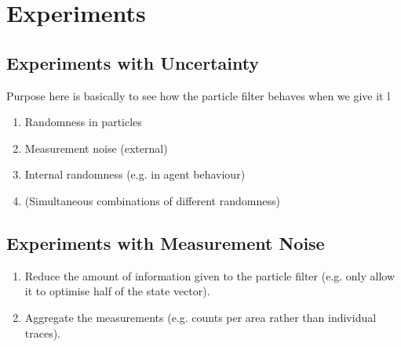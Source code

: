 \section{Experiments\label{experiments}}

\subsection{Experiments with Uncertainty}

Purpose here is basically to see how the particle filter behaves when we give it l

\begin{enumerate}
\item Randomness in particles
\item Measurement noise (external)
\item Internal randomness (e.g. in agent behaviour)
\item (Simultaneous combinations of different randomness)
\end{enumerate}

\subsection{Experiments with Measurement Noise}

\begin{enumerate}
\item Reduce the amount of information given to the particle filter (e.g. only allow it to optimise half of the state vector).
\item Aggregate the measurements (e.g. counts per area rather than individual traces).
\end{enumerate}

